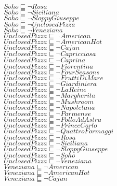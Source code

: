 \documentclass[a4paper,10pt]{article}
\begin{document}
 $Soho \sqsubseteq  \lnot Rosa$\\ 
 $Soho \sqsubseteq  \lnot Siciliana$\\ 
 $Soho \sqsubseteq  \lnot SloppyGiuseppe$\\ 
 $Soho \sqsubseteq  \lnot UnclosedPizza$\\ 
 $Soho \sqsubseteq  \lnot Veneziana$\\ 
 $UnclosedPizza \sqsubseteq  \lnot American$\\ 
 $UnclosedPizza \sqsubseteq  \lnot AmericanHot$\\ 
 $UnclosedPizza \sqsubseteq  \lnot Cajun$\\ 
 $UnclosedPizza \sqsubseteq  \lnot Capricciosa$\\ 
 $UnclosedPizza \sqsubseteq  \lnot Caprina$\\ 
 $UnclosedPizza \sqsubseteq  \lnot Fiorentina$\\ 
 $UnclosedPizza \sqsubseteq  \lnot FourSeasons$\\ 
 $UnclosedPizza \sqsubseteq  \lnot FruttiDiMare$\\ 
 $UnclosedPizza \sqsubseteq  \lnot Giardiniera$\\ 
 $UnclosedPizza \sqsubseteq  \lnot LaReine$\\ 
 $UnclosedPizza \sqsubseteq  \lnot Margherita$\\ 
 $UnclosedPizza \sqsubseteq  \lnot Mushroom$\\ 
 $UnclosedPizza \sqsubseteq  \lnot Napoletana$\\ 
 $UnclosedPizza \sqsubseteq  \lnot Parmense$\\ 
 $UnclosedPizza \sqsubseteq  \lnot PolloAdAstra$\\ 
 $UnclosedPizza \sqsubseteq  \lnot PrinceCarlo$\\ 
 $UnclosedPizza \sqsubseteq  \lnot QuattroFormaggi$\\ 
 $UnclosedPizza \sqsubseteq  \lnot Rosa$\\ 
 $UnclosedPizza \sqsubseteq  \lnot Siciliana$\\ 
 $UnclosedPizza \sqsubseteq  \lnot SloppyGiuseppe$\\ 
 $UnclosedPizza \sqsubseteq  \lnot Soho$\\ 
 $UnclosedPizza \sqsubseteq  \lnot Veneziana$\\ 
 $Veneziana \sqsubseteq  \lnot American$\\ 
 $Veneziana \sqsubseteq  \lnot AmericanHot$\\ 
 $Veneziana \sqsubseteq  \lnot Cajun$\\ 
\end{document}
